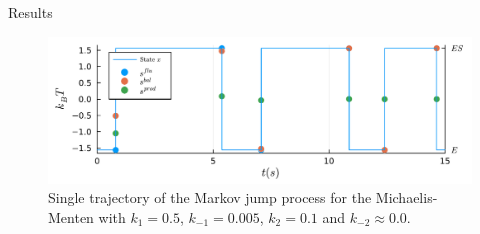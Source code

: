 \documentclass[final]{beamer}
\newlength{\colwidth}
\begin{document}
\begin{frame}[t]
\begin{columns}[t]
\begin{column}{\colwidth}
\begin{block}{Results}
%
%
%
%
\begin{figure}
\begin{center}
%
\includegraphics[scale=1.2]{graphics/f8.pdf}
\end{center}
\caption{\justifying Single trajectory of the Markov jump process for the Michaelis-Menten with $k_{1} = 0.5$, $k_{-1} = 0.005$, $k_{2} = 0.1$ and $k_{-2} \approx 0.0$.}\label{fig transition}
\end{figure}




\end{block}
\end{column}
\end{columns}
\end{frame}
\end{document}
